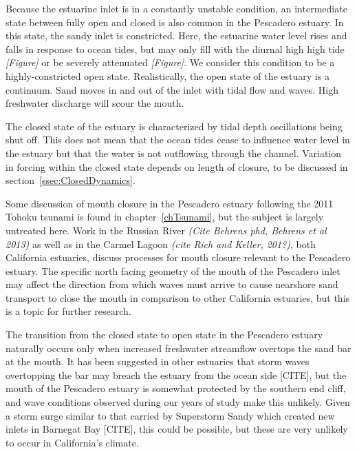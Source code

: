 

Because the estuarine inlet is in a constantly unstable condition, an intermediate state between fully open and closed is also common in the Pescadero estuary.  In this state, the sandy inlet is constricted. Here, the estuarine water level rises and falls in response to ocean tides, but may only fill with the diurnal high high tide \emph{[Figure]} or be severely attenuated \emph{[Figure]}. We consider this condition to be a highly-constricted open state. Realistically, the open state of the estuary is a continuum. Sand moves in and out of the inlet with tidal flow and waves. High freshwater discharge will scour the mouth.

The closed state of the estuary is characterized by tidal depth oscillations being shut off. This does not mean that the ocean tides cease to influence water level in the estuary but that the water is not outflowing through the channel. Variation in forcing within the closed
state depends on length of closure, to be discussed in section~\ref{ssec:ClosedDynamics}.

Some discussion of mouth closure in the Pescadero estuary following the 2011 Tohoku tsunami is found in chapter~\ref{chTsunami}, but the subject is largely untreated here. Work in the Russian River \emph{(Cite Behrens phd, Behrens et al 2013)} as well as in the Carmel Lagoon \emph{(cite Rich and Keller, 201?)}, both California estuaries, discuss processes for mouth closure relevant to the Pescadero estuary. The specific north facing geometry of the mouth of the Pescadero inlet may affect the direction from which waves must arrive to cause nearshore sand transport to close the mouth in comparison to other California estuaries, but this is a topic for further research.

The transition from the closed state to open state in the Pescadero estuary naturally occurs only when increased freshwater streamflow overtops the sand bar at the mouth. It has been suggested in other estuaries that storm waves overtopping the bar may breach the estuary from the ocean side [CITE], but the mouth of the Pescadero estuary is
somewhat protected by the southern end cliff, and wave conditions observed during our years of study make this unlikely. Given a storm surge similar to that carried by Superstorm Sandy which created new inlets in Barnegat Bay [CITE], this could be possible, but these are very unlikely to occur in California's climate.

